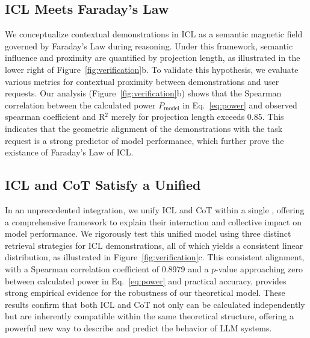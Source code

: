 \subsection{ICL Meets Faraday's Law}
We conceptualize contextual demonstrations in ICL as a semantic magnetic field governed by Faraday's Law during reasoning. Under this framework, semantic influence and proximity are quantified by projection length, as illustrated in the lower right of Figure~\ref{fig:verification}b. To validate this hypothesis, we evaluate various metrics for contextual proximity between demonstrations and user requests. Our analysis (Figure~\ref{fig:verification}b) shows that the Spearman correlation between the calculated power $P_{\text{model}}$ in Eq.~\ref{eq:power} and observed spearman coefficient and R$^2$ merely for projection length exceeds 0.85. This indicates that the geometric alignment of the demonstrations with the task request is a strong predictor of model performance, which further prove the existance of Faraday's Law of ICL.

\subsection{ICL and CoT Satisfy a Unified \modelname{}}
In an unprecedented integration, we unify ICL and CoT within a single \modelname{}, offering a comprehensive framework to explain their interaction and collective impact on model performance. We rigorously test this unified model using three distinct retrieval strategies for ICL demonstrations, all of which yields a consistent linear distribution, as illustrated in Figure~\ref{fig:verification}c. This consistent alignment, with a Spearman correlation coefficient of 0.8979 and a $p$-value approaching zero between calculated power in Eq.~\ref{eq:power} and practical accuracy, provides strong empirical evidence for the robustness of our theoretical model. These results confirm that both ICL and CoT not only can be calculated independently but are inherently compatible within the same theoretical structure, offering a powerful new way to describe and predict the behavior of LLM systems.
\vspace{-3pt}

